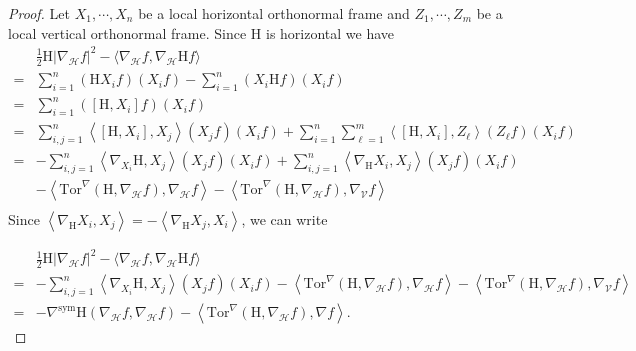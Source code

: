 \documentclass[11pt]{article}
\numberwithin{equation}{section}
\newcommand{\Ho}{\mathcal H}
\newcommand{\V}{\mathcal V}
\begin{document}
    \begin{proof}
Let $X_1,\cdots,X_n$ be a local  horizontal orthonormal frame and $Z_1,\cdots,Z_m$ be a local vertical orthonormal frame. Since $\mathrm H$ is horizontal we have
\begin{align*}
& \frac{1}{2}\mathrm H | \nabla_\Ho f|^2-\langle \nabla_{\mathcal{H}} f , \nabla_{\mathcal{H}}\mathrm H f \rangle \\
=&\sum_{i=1}^n (\mathrm HX_i f)(X_i f)-\sum_{i=1}^n (X_i \mathrm Hf)(X_i f) \\
=&\sum_{i=1}^n ([\mathrm H,X_i]f)(X_i f) \\
=&\sum_{i,j=1}^n \left\langle [\mathrm H,X_i],X_j \right\rangle (X_j f)(X_i f)+\sum_{i=1}^n\sum_{\ell=1}^m  \left\langle [\mathrm H,X_i],Z_\ell \right\rangle (Z_\ell f)(X_i f)\\
=&-\sum_{i,j=1}^n \left\langle \nabla_{X_i} \mathrm H,X_j \right\rangle (X_j f)(X_i f)+\sum_{i,j=1}^n \left\langle \nabla_{\mathrm H}X_i ,X_j \right\rangle (X_j f)(X_i f)\\
&-\left\langle \mathrm{Tor}^\nabla (\mathrm H, \nabla_\Ho f), \nabla_\Ho f \right\rangle-\left\langle \mathrm{Tor}^\nabla (\mathrm H, \nabla_\Ho f), \nabla_\V f \right\rangle \\
\end{align*}
Since $\left\langle \nabla_{\mathrm H}X_i ,X_j \right\rangle=-\left\langle \nabla_{\mathrm H}X_j ,X_i \right\rangle$, we can write

\begin{align*}
& \frac{1}{2}\mathrm H | \nabla_\Ho f|^2-\langle \nabla_{\mathcal{H}} f , \nabla_{\mathcal{H}}\mathrm H f \rangle \\
=&-\sum_{i,j=1}^n \left\langle \nabla_{X_i} \mathrm H,X_j \right\rangle (X_j f)(X_i f)-\left\langle \mathrm{Tor}^\nabla (\mathrm H, \nabla_\Ho f), \nabla_\Ho f \right\rangle-\left\langle \mathrm{Tor}^\nabla (\mathrm H, \nabla_\Ho f), \nabla_\V f \right\rangle \\
=&- \nabla^{\mathrm{sym}}\mathrm H(\nabla_\Ho f,\nabla_\Ho f)-\left\langle \mathrm{Tor}^\nabla (\mathrm H, \nabla_\Ho f), \nabla f \right\rangle.    
\end{align*}



\end{proof}
\end{document}

